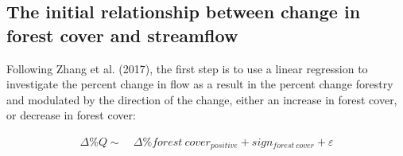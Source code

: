 \documentclass[]{elsarticle} %
\begin{document}
\hypertarget{the-initial-relationship-between-change-in-forest-cover-and-streamflow}{%
\subsection{The initial relationship between change in forest cover and
streamflow}\label{the-initial-relationship-between-change-in-forest-cover-and-streamflow}}

Following Zhang et al. (2017), the first step is to use a linear
regression to investigate the percent change in flow as a result in the
percent change forestry and modulated by the direction of the change,
either an increase in forest cover, or decrease in forest cover:

\[\tag{3}
\begin{aligned}
\Delta \% Q \sim ~ &\Delta \% forest~cover_{positive} + sign_{forest~cover} + \varepsilon
\end{aligned}\]
\end{document}
